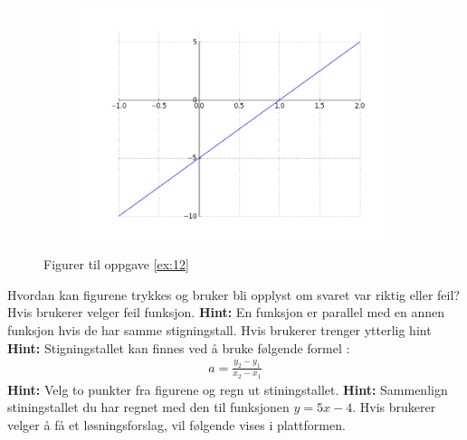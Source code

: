 \documentclass[12pt,twoside,onecolumn]{article}
\begin{document}
\begin{Exercise}
\begin{figure}[h!]
\begin{subfigure}{.5\textwidth}
    \centering
    \includegraphics[scale = 0.4]{figures/5xm5.png}
    \end{subfigure}
    \caption{Figurer til oppgave \ref{ex:12}}
\end{figure}
{\color{Cerulean} Hvordan kan figurene trykkes og bruker bli opplyst om svaret var riktig eller feil?}
\newline
\newline
{\color{Maroon} Hvis brukerer velger feil funksjon.}
\newline
\textbf{Hint:} En funksjon er parallel med en annen funksjon hvis de har samme stigningstall. 
\newline
\newline
{\color{Maroon} Hvis brukerer trenger ytterlig hint}
\newline
\textbf{Hint:} Stigningstallet kan finnes ved å bruke følgende formel :
\begin{align}
a = \frac{y_2 - y_1}{x_2 - x_1}
\end{align} 
\newline
\newline
\textbf{Hint:} Velg to punkter fra figurene og regn ut stiningstallet. 
\newline
\newline
\textbf{Hint:} Sammenlign stiningstallet du har regnet med den til funksjonen $y = 5x - 4$.
\newline
\newline
{\color{Maroon} Hvis brukerer velger å få et løsningsforslag, vil følgende vises i plattformen.}
\begin{enumerate}

\end{enumerate}
\end{Exercise}
\end{document}
